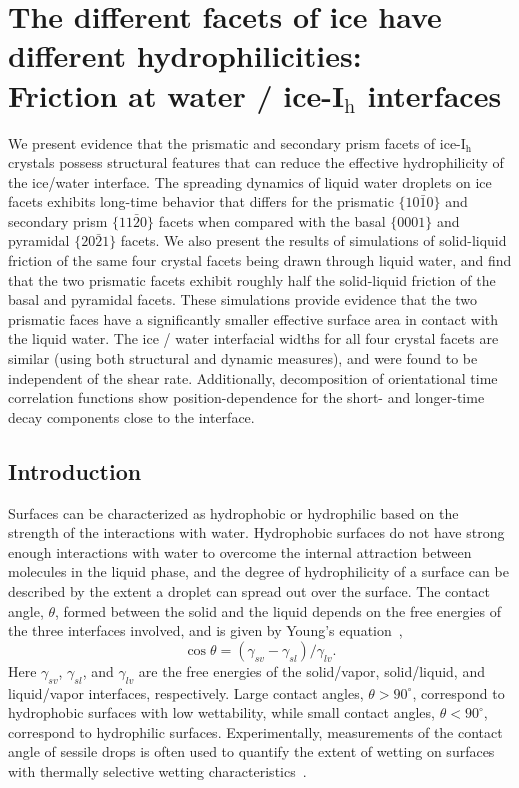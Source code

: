 \chapter{The different facets of ice have different hydrophilicities: \\
  Friction at water / ice-I$_\mathrm{h}$ interfaces}

  We present evidence that the prismatic and secondary prism facets of
  ice-I$_\mathrm{h}$ crystals possess structural features that can
  reduce the effective hydrophilicity of the ice/water interface. The
  spreading dynamics of liquid water droplets on ice facets exhibits
  long-time behavior that differs for the prismatic
  $\{10\bar{1}0\}$ and secondary prism $\{11\bar{2}0\}$ facets
  when compared with the basal $\{0001\}$ and pyramidal
  $\{20\bar{2}1\}$ facets.  We also present the results of
  simulations of solid-liquid friction of the same four crystal facets
  being drawn through liquid water, and find that the two prismatic
  facets exhibit roughly half the solid-liquid friction of the basal
  and pyramidal facets.  These simulations provide evidence that the
  two prismatic faces have a significantly smaller effective surface
  area in contact with the liquid water. The ice / water interfacial
  widths for all four crystal facets are similar (using both
  structural and dynamic measures), and were found to be independent
  of the shear rate.  Additionally, decomposition of orientational
  time correlation functions show position-dependence for the short-
  and longer-time decay components close to the interface.

\section{Introduction}
Surfaces can be characterized as hydrophobic or hydrophilic
based on the strength of the interactions with water. Hydrophobic
surfaces do not have strong enough interactions with water to overcome
the internal attraction between molecules in the liquid phase, and the
degree of hydrophilicity of a surface can be described by the extent a
droplet can spread out over the surface. The contact angle, $\theta$,
formed between the solid and the liquid depends on the free energies
of the three interfaces involved, and is given by Young's
equation~\cite{Young2005},
\begin{equation}\label{young}
\cos\theta = (\gamma_{sv} - \gamma_{sl})/\gamma_{lv} .
\end{equation} 
Here $\gamma_{sv}$, $\gamma_{sl}$, and $\gamma_{lv}$ are the free
energies of the solid/vapor, solid/liquid, and liquid/vapor interfaces,
respectively.  Large contact angles, $\theta > 90^{\circ}$, correspond
to hydrophobic surfaces with low wettability, while small contact
angles, $\theta < 90^{\circ}$, correspond to hydrophilic surfaces.
Experimentally, measurements of the contact angle of sessile drops is
often used to quantify the extent of wetting on surfaces with
thermally selective wetting
characteristics~\cite{Tadanaga2000,Liu2004,Sun2004}.

